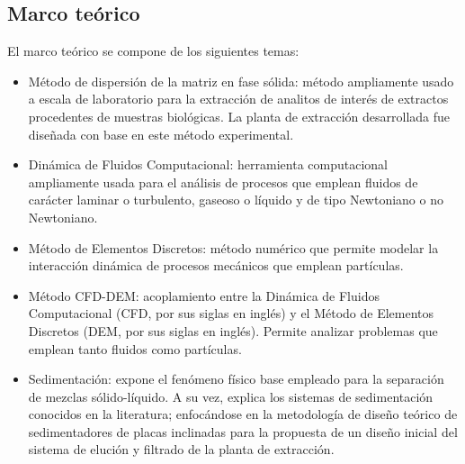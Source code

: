 \begin{center}
	\section{Marco te\'orico}
\end{center}

\noindent
\justify

El marco te\'orico se compone de los siguientes temas: 

\begin{itemize}
	\item M\'etodo de dispersi\'on de la matriz en fase s\'olida: m\'etodo ampliamente usado a escala de laboratorio para la extracci\'on de analitos de inter\'es de extractos procedentes de muestras biol\'ogicas. La planta de extracci\'on desarrollada fue dise\~nada con base en este m\'etodo experimental.
	\item Din\'amica de Fluidos Computacional: herramienta computacional ampliamente usada para el an\'alisis de procesos que emplean fluidos de car\'acter laminar o turbulento, gaseoso o l\'iquido y de tipo Newtoniano o no Newtoniano.
	\item M\'etodo de Elementos Discretos: m\'etodo num\'erico que permite modelar la interacci\'on din\'amica de procesos mec\'anicos que emplean part\'iculas. 
	\item M\'etodo CFD-DEM: acoplamiento entre la Din\'amica de Fluidos Computacional (CFD, por sus siglas en ingl\'es) y el M\'etodo de Elementos Discretos (DEM, por sus siglas en ingl\'es). Permite analizar problemas que emplean tanto fluidos como part\'iculas.
	\item Sedimentaci\'on: expone el fen\'omeno f\'isico base empleado para la separaci\'on de mezclas s\'olido-l\'iquido. A su vez, explica los sistemas de sedimentaci\'on conocidos en la literatura; enfoc\'andose en la metodolog\'ia de dise\~no te\'orico de sedimentadores de placas inclinadas para la propuesta de un dise\~no inicial del sistema de eluci\'on y filtrado de la planta de extracci\'on.
\end{itemize}










